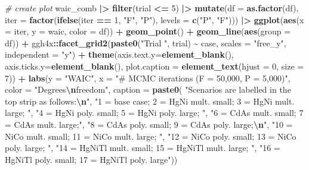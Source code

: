 \documentclass[12pt, twoside]{amherstthesis}
\newenvironment{Shaded}{\begin{snugshade}}{\end{snugshade}}
\newcommand{\AttributeTok}[1]{\textcolor[rgb]{0.13,0.29,0.53}{#1}}
\newcommand{\CommentTok}[1]{\textcolor[rgb]{0.56,0.35,0.01}{\textit{#1}}}
\newcommand{\DecValTok}[1]{\textcolor[rgb]{0.00,0.00,0.81}{#1}}
\newcommand{\FunctionTok}[1]{\textcolor[rgb]{0.13,0.29,0.53}{\textbf{#1}}}
\newcommand{\NormalTok}[1]{#1}
\newcommand{\SpecialCharTok}[1]{\textcolor[rgb]{0.81,0.36,0.00}{\textbf{#1}}}
\newcommand{\StringTok}[1]{\textcolor[rgb]{0.31,0.60,0.02}{#1}}
\begin{document}
\begin{Shaded}
\begin{Highlighting}[]
\CommentTok{\# create plot}
\NormalTok{waic\_comb }\SpecialCharTok{|\textgreater{}} 
  \FunctionTok{filter}\NormalTok{(trial }\SpecialCharTok{\textless{}=} \DecValTok{5}\NormalTok{) }\SpecialCharTok{|\textgreater{}} 
  \FunctionTok{mutate}\NormalTok{(}\AttributeTok{df =} \FunctionTok{as.factor}\NormalTok{(df), }
         \AttributeTok{iter =} \FunctionTok{factor}\NormalTok{(}\FunctionTok{ifelse}\NormalTok{(iter }\SpecialCharTok{==} \DecValTok{1}\NormalTok{, }\StringTok{"F"}\NormalTok{, }\StringTok{"P"}\NormalTok{), }\AttributeTok{levels =} \FunctionTok{c}\NormalTok{(}\StringTok{"P"}\NormalTok{, }\StringTok{"F"}\NormalTok{))) }\SpecialCharTok{|\textgreater{}} 
  \FunctionTok{ggplot}\NormalTok{(}\FunctionTok{aes}\NormalTok{(}\AttributeTok{x =}\NormalTok{ iter, }\AttributeTok{y =}\NormalTok{ waic, }\AttributeTok{color =}\NormalTok{ df)) }\SpecialCharTok{+}
  \FunctionTok{geom\_point}\NormalTok{() }\SpecialCharTok{+}
  \FunctionTok{geom\_line}\NormalTok{(}\FunctionTok{aes}\NormalTok{(}\AttributeTok{group =}\NormalTok{ df)) }\SpecialCharTok{+} 
\NormalTok{  ggh4x}\SpecialCharTok{::}\FunctionTok{facet\_grid2}\NormalTok{(}\FunctionTok{paste0}\NormalTok{(}\StringTok{"Trial "}\NormalTok{, trial) }\SpecialCharTok{\textasciitilde{}}\NormalTok{ case, }
                     \AttributeTok{scales =} \StringTok{"free\_y"}\NormalTok{, }\AttributeTok{independent =} \StringTok{"y"}\NormalTok{) }\SpecialCharTok{+}
  \FunctionTok{theme}\NormalTok{(}\AttributeTok{axis.text.y=}\FunctionTok{element\_blank}\NormalTok{(),}
        \AttributeTok{axis.ticks.y=}\FunctionTok{element\_blank}\NormalTok{(), }
        \AttributeTok{plot.caption =} \FunctionTok{element\_text}\NormalTok{(}\AttributeTok{hjust =} \DecValTok{0}\NormalTok{, }\AttributeTok{size =} \DecValTok{7}\NormalTok{)) }\SpecialCharTok{+}
  \FunctionTok{labs}\NormalTok{(}\AttributeTok{y =} \StringTok{"WAIC"}\NormalTok{, }\AttributeTok{x =} \StringTok{"\# MCMC iterations (F = 50,000, P = 5,000)"}\NormalTok{, }
       \AttributeTok{color =} \StringTok{"Degrees}\SpecialCharTok{\textbackslash{}n}\StringTok{freedom"}\NormalTok{,}
       \AttributeTok{caption =} \FunctionTok{paste0}\NormalTok{(}
         \StringTok{"Scenarios are labelled in the top strip as follows:}\SpecialCharTok{\textbackslash{}n}\StringTok{"}\NormalTok{, }
         \StringTok{"1 = base case; 2 = HgNi mult. small; 3 = HgNi mult. large; "}\NormalTok{, }
         \StringTok{"4 = HgNi poly. small; 5 = HgNi poly. large; "}\NormalTok{, }
         \StringTok{"6 = CdAs mult. small; 7 = CdAs mult. large;"}\NormalTok{, }
         \StringTok{"8 = CdAs poly. small; 9 = CdAs poly. large;}\SpecialCharTok{\textbackslash{}n}\StringTok{"}\NormalTok{, }
         \StringTok{"10 = NiCo mult. small; 11 = NiCo mult. large; "}\NormalTok{, }
         \StringTok{"12 = NiCo poly. small; 13 = NiCo poly. large; "}\NormalTok{, }
         \StringTok{"14 = HgNiTl mult. small; 15 = HgNiTl mult. large; "}\NormalTok{, }
         \StringTok{"16 = HgNiTl poly. small; 17 = HgNiTl poly. large"}\NormalTok{))}


\end{Highlighting}
\end{Shaded}
\end{document}
